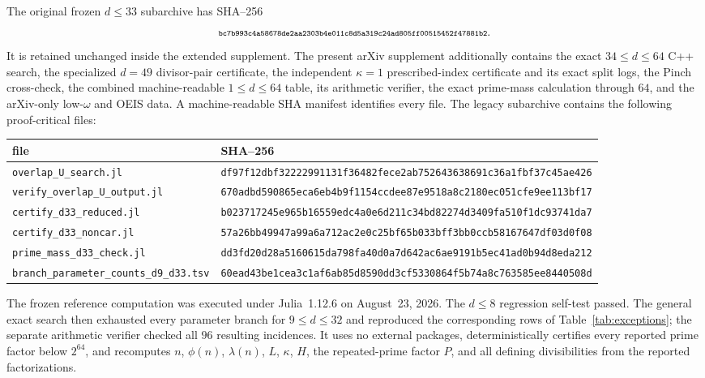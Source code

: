 \documentclass[11pt]{article}
\begin{document}
The original frozen $d\le33$ subarchive has SHA--256
\[
\text{\scriptsize\ttfamily bc7b993c4a58678de2aa2303b4e011c8d5a319c24ad805ff00515452f47881b2}.
\]
It is retained unchanged inside the extended supplement.  The present arXiv
supplement additionally contains the exact $34\le d\le64$ C++ search,
the specialized $d=49$ divisor-pair certificate, the independent $\kappa=1$
prescribed-index certificate and its exact split logs, the Pinch cross-check,
the combined machine-readable $1\le d\le64$ table, its arithmetic verifier,
the exact prime-mass calculation through $64$, and the arXiv-only low-$\omega$
and OEIS data.  A machine-readable SHA manifest identifies every file.  The
legacy subarchive contains the following proof-critical files:
\begin{center}
\scriptsize
\begin{tabularx}{\textwidth}{lX}
\toprule
file & SHA--256\\
\midrule
\texttt{overlap\_U\_search.jl} &
\texttt{df97f12dbf322229\allowbreak 91131f36482fece2\allowbreak ab752643638691c3\allowbreak 6a1fbf37c45ae426}\\
\texttt{verify\_overlap\_U\_output.jl} &
\texttt{670adbd590865eca\allowbreak 6eb4b9f1154ccdee\allowbreak 87e9518a8c2180ec\allowbreak 051cfe9ee113bf17}\\
\texttt{certify\_d33\_reduced.jl} &
\texttt{b023717245e965b1\allowbreak 6559edc4a0e6d211\allowbreak c34bd82274d3409f\allowbreak a510f1dc93741da7}\\
\texttt{certify\_d33\_noncar.jl} &
\texttt{57a26bb49947a99a\allowbreak 6a712ac2e0c25bf6\allowbreak 5b033bff3bb0ccb5\allowbreak 8167647df03d0f08}\\
\texttt{prime\_mass\_d33\_check.jl} &
\texttt{dd3fd20d28a51606\allowbreak 15da798fa40d0a7d\allowbreak 642ac6ae9191b5ec\allowbreak 41ad0b94d8eda212}\\
\texttt{branch\_parameter\_counts\_d9\_d33.tsv} &
\texttt{60ead43be1cea3c1\allowbreak af6ab85d8590dd3c\allowbreak f5330864f5b74a8c\allowbreak 763585ee8440508d}\\
\bottomrule
\end{tabularx}
\end{center}

The frozen reference computation was executed under Julia~1.12.6 on
August~23, 2026.  The $d\le8$ regression self-test passed.  The general exact
search then exhausted every parameter branch for $9\le d\le32$ and reproduced
the corresponding rows of Table~\ref{tab:exceptions}; the separate arithmetic verifier
checked all $96$ resulting incidences.  It uses no external packages,
deterministically certifies every reported prime factor below $2^{64}$, and
recomputes $n$, $\phi(n)$, $\lambda(n)$, $L$, $\kappa$, $H$, the repeated-prime
factor $P$, and all defining divisibilities from the reported factorizations.
\end{document}

